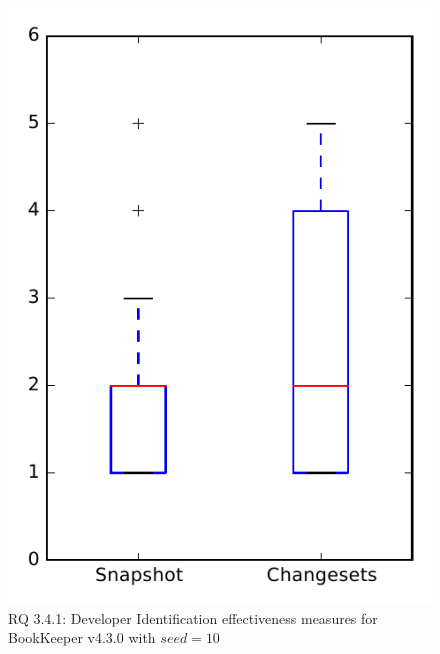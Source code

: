 
\begin{figure}
\centering
\includegraphics[height=0.4\textheight]{figures/dit_seed/rq1_bookkeeper_10}
\caption{RQ 3.4.1: Developer Identification effectiveness measures for BookKeeper v4.3.0 with $seed=10$}
\label{fig:dit_seed:rq1:bookkeeper}
\end{figure}
